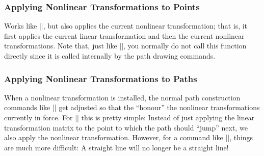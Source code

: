 \subsubsection{Applying Nonlinear Transformations to Points}

\begin{command}{\pgfpointtransformednonlinear{}}
    Works like |\pgfpointtransformed|, but also applies the current nonlinear
    transformation; that is, it first applies the current linear transformation
    and then the current nonlinear transformations. Note that, just like
    |\pgfpointtransformed|, you normally do not call this function directly
    since it is called internally by the path drawing commands.
\end{command}


\subsubsection{Applying Nonlinear Transformations to Paths}

When a nonlinear transformation is installed, the normal path construction
commands like |\pgfpathmoveto| get adjusted so that the ``honour'' the
nonlinear transformations currently in force. For |\pgfpathmoveto| this is
pretty simple: Instead of just applying the linear transformation matrix to the
point to which the path should ``jump'' next, we also apply the nonlinear
transformation. However, for a command like |\pgfpathlineto|, things are much
more difficult: A straight line will no longer be a straight line!

